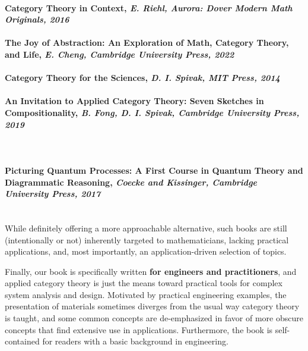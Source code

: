 \documentclass[10pt, article, one side]{memoir}
\begin{document}
\paragraph{Category Theory in Context, \emph{E. Riehl, Aurora: Dover Modern Math Originals, 2016}}

\paragraph{The Joy of Abstraction: An Exploration of Math, Category Theory, and Life, \emph{E. Cheng, Cambridge University Press, 2022}}

\paragraph{Category Theory for the Sciences, \emph{D. I. Spivak, MIT Press, 2014}}

\paragraph{An Invitation to Applied Category Theory: Seven Sketches in Compositionality, \emph{B. Fong, D. I. Spivak, Cambridge University Press, 2019}
}





\
\\


\paragraph{Picturing Quantum Processes: A First Course in Quantum Theory and Diagrammatic Reasoning, \emph{Coecke and Kissinger, Cambridge University Press, 2017}}

\
\\




    While definitely offering a more approachable alternative, such books are still (intentionally or not) inherently targeted to mathematicians, lacking practical applications, and, most importantly, an application-driven selection of topics.

    Finally, our book is specifically written \textbf{for engineers and practitioners}, and applied category theory is just the means toward practical tools for complex system analysis and design.
    Motivated by practical engineering examples, the presentation of materials sometimes diverges from the usual way category theory is taught, and some common concepts are de-emphasized in favor of more obscure concepts that find extensive use in applications.
    Furthermore, the book is self-contained for readers with a basic background in engineering.
\end{document}
